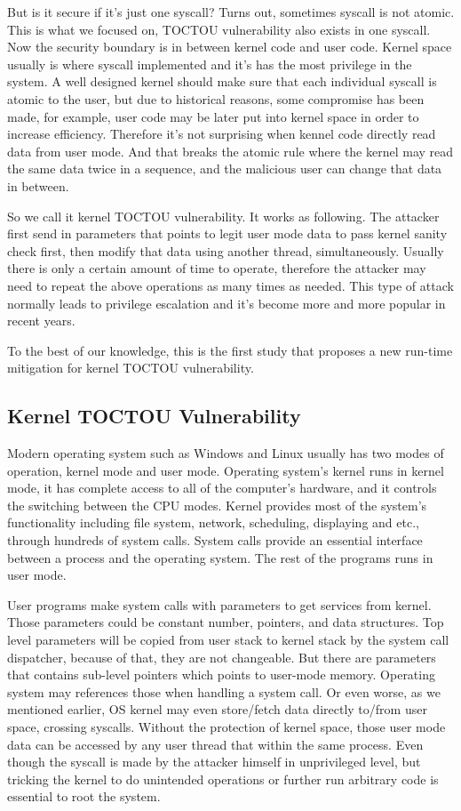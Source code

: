 But is it secure if it's just one syscall? Turns out, sometimes syscall is not atomic. This is what we focused on, TOCTOU vulnerability also exists in one syscall. Now the security boundary is in between kernel code and user code. Kernel space usually is where syscall implemented and it's has the most privilege in the system. A well designed kernel should make sure that each individual syscall is atomic to the user, but due to historical reasons, some compromise has been made, for example, user code may be later put into kernel space in order to increase efficiency. Therefore it's not surprising when kennel code directly read data from user mode. And that breaks the atomic rule where the kernel may read the same data twice in a sequence, and the malicious user can change that data in between. 

So we call it kernel TOCTOU vulnerability. It works as following. The attacker first send in parameters that points to legit user mode data to pass kernel sanity check first, then modify that data using another thread, simultaneously. Usually there is only a certain amount of time to operate, therefore the attacker may need to repeat the above operations as many times as needed. This type of attack normally leads to privilege escalation and it's become more and more popular in recent years.


To the best of our knowledge, this is the first study that proposes a new run-time mitigation for kernel TOCTOU vulnerability. 

\subsection{Kernel TOCTOU Vulnerability}

Modern operating system such as Windows and Linux usually has two modes of operation, kernel mode and user mode. Operating system's kernel runs in kernel mode, it has complete access to all of the computer's hardware, and it controls the switching between the CPU modes. Kernel provides most of the system's functionality including file system, network, scheduling, displaying and etc., through hundreds of system calls. System calls provide an essential interface between a process and the operating system. The rest of the programs runs in user mode. 

User programs make system calls with parameters to get services from kernel. Those parameters could be constant number, pointers, and data structures. Top level parameters will be copied from user stack to kernel stack by the system call dispatcher, because of that, they are not changeable. But there are parameters that contains sub-level pointers which points to user-mode memory. Operating system may references those when handling a system call. Or even worse, as we mentioned earlier, OS kernel may even store/fetch data directly to/from user space, crossing syscalls. Without the protection of kernel space, those user mode data can be accessed by any user thread that within the same process. Even though the syscall is made by the attacker himself in unprivileged level, but tricking the kernel to do unintended operations or further run arbitrary code is essential to root the system.     

